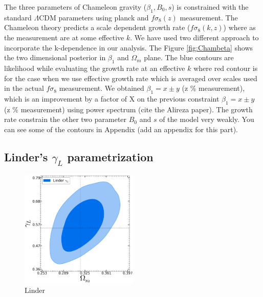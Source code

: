 The three parameters of Chameleon gravity ($\beta_1, B_0, s$) is constrained with the standard $\Lambda$CDM parameters using planck and $f\sigma_8(z)$ measurement. The Chameleon theory predicts a scale dependent growth rate ($f\sigma_8(k,z)$) where as the measurement are at some effective $k$. We have used two different approach to incorporate the k-dependence in our analysis. The Figure \ref{fig:Chambeta} shows the two dimensional posterior in $\beta_1$ and $\Omega_m$ plane. The blue contours are likelihood while evaluating the growth rate at an effective $k$ where red contour is for the case when we use effective growth rate which is averaged over scales used in the actual $f\sigma_8$ measurement. We obtained $\beta_1= x \pm y$ (z \% measurement), which is an improvement by a factor of X on the previous constraint $\beta_1= x \pm y$ (z \% measurement) using power spectrum (cite the Alireza paper). The growth rate constrain the other two parameter $B_0$ and $s$ of the model very weakly. You can see some of the contours in Appendix (add an appendix for this part).


\subsection{Linder's $\gamma_L$ parametrization}
\begin{figure}
    \begin{center}        
        \includegraphics[width=0.5\textwidth]{plots/Like-2D/Lind-omegam-Linder_gamma_2D.png}
     \end{center}
     \caption{Linder}
     \label{fig:Linder}
\end{figure}

